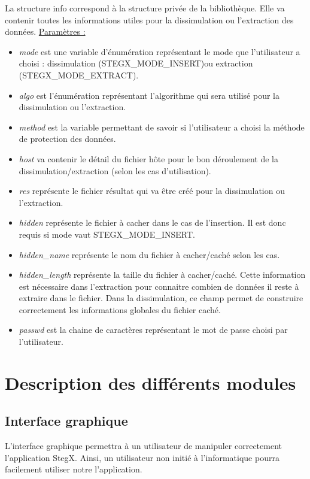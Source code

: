 \documentclass[11pt]{article}
\begin{document}
La structure info correspond à la structure privée de la bibliothèque. 
Elle va contenir toutes les informations utiles pour la dissimulation ou 
l'extraction des données. 
\newline
\underline{Paramètres :}
\begin{itemize}
\item \textit{mode} est une variable d'énumération représentant le mode que 
l'utilisateur a choisi : dissimulation (STEGX\_MODE\_INSERT)ou extraction 
(STEGX\_MODE\_EXTRACT). 
\item \textit{algo} est l'énumération représentant l'algorithme qui sera utilisé
pour la dissimulation ou l'extraction. 
\item \textit{method} est la variable permettant de savoir si l'utilisateur 
a choisi la méthode de protection des données. 
\item \textit{host} va contenir le détail du fichier hôte pour le bon déroulement 
de la dissimulation/extraction (selon les cas d'utilisation). 
\item \textit{res} représente le fichier résultat qui va être créé pour la 
dissimulation ou l'extraction.  
\item \textit{hidden} représente le fichier à cacher dans le cas de l'insertion. 
Il est donc requis si mode vaut STEGX\_MODE\_INSERT. 
\item \textit{hidden\_name} représente le nom du fichier à cacher/caché selon 
les cas. 
\item \textit{hidden\_length} représente la taille du fichier à cacher/caché. 
Cette information est nécessaire dans l'extraction pour connaitre combien de 
données il reste à extraire dans le fichier. Dans la dissimulation, ce champ 
permet de construire correctement les informations globales du fichier caché. 
\item \textit{passwd} est la chaine de caractères représentant le mot de passe 
choisi par l'utilisateur. 
\newline
\end{itemize}

\section{Description des différents modules}
\subsection{Interface graphique}

L'interface graphique permettra à un utilisateur de manipuler correctement
l'application StegX. Ainsi, un utilisateur non initié à l'informatique pourra
facilement utiliser notre l'application. 
\end{document}
